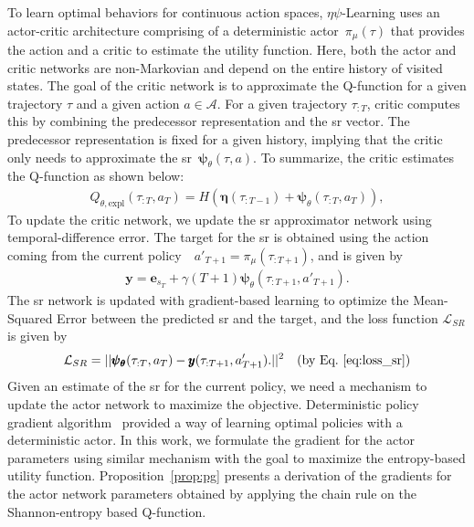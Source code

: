 \documentclass{article}
\theoremstyle{plain}
\theoremstyle{definition}
\theoremstyle{remark}
\newcommand{\alg}{$\eta$$\psi$-Learning}
\begin{document}
To learn optimal behaviors for continuous action spaces, \alg{} uses an actor-critic architecture comprising of a deterministic actor~$\pi_{\mu}(\tau)$ that provides the action and a critic to estimate the utility function. 
Here, both the actor and critic networks are non-Markovian and depend on the entire history of visited states.
The goal of the critic network is to approximate the Q-function for a given trajectory $\tau$ and a given action $a \in \mathcal{A}$.
For a given trajectory $\tau_{:T}$, critic computes this by combining the predecessor representation and the \gls{sr} vector.
The predecessor representation is fixed for a given history, implying that the critic only needs to approximate the \gls{sr}~$\pmb{\psi}_{\theta}(\tau, a)$.
To summarize, the critic estimates the Q-function as shown below:
\begin{align}
    \label{eq:Q-function_entropy_}
    Q_{\theta,\text{expl}}(\tau_{:T}, a_T) = H\left(\pmb{\eta} (\tau_{:T-1}) + \pmb{\psi}_{\theta} (\tau_{:T}, a_T)\right),
\end{align}
To update the critic network, we update the \gls{sr} approximator network using temporal-difference error. 
The target for the \gls{sr} is obtained using the action coming from the current policy~~$a'_{T+1}=\pi_{\mu}(\tau_{:T+1})$, and is given by
\begin{align}
    \pmb{y} = \pmb{e}_{s_T} + \gamma(T+1)\pmb{\psi}_{\theta}(\tau_{:T+1}, a'_{T+1}).
\end{align}
The \gls{sr} network is updated with gradient-based learning to optimize the Mean-Squared Error between the predicted \gls{sr} and the target, and the loss function $\mathcal{L}_{SR}$ is given by
\begin{align}
    \label{eq:loss_sr}
    \mathcal{L}_{SR} &=  || \pmb{\psi}_{\pmb{\theta}} (\tau_{:T}, a_{T})  - \pmb{y}(\tau_{:T+1},a'_{T+1}). ||^2 &\text{(by Eq.~\eqref{eq:loss_sr})} \nonumber
\end{align}
Given an estimate of the \gls{sr} for the current policy, we need a mechanism to update the actor network to maximize the objective.
Deterministic policy gradient algorithm~\cite{silver2014deterministic} provided a way of learning optimal policies with a deterministic actor. 
In this work, we formulate the gradient for the actor parameters using similar mechanism with the goal to maximize the entropy-based utility function.
Proposition~\autoref{prop:pg} presents a derivation of the gradients for the actor network parameters obtained by applying the chain rule on the Shannon-entropy based Q-function. 
\end{document}
